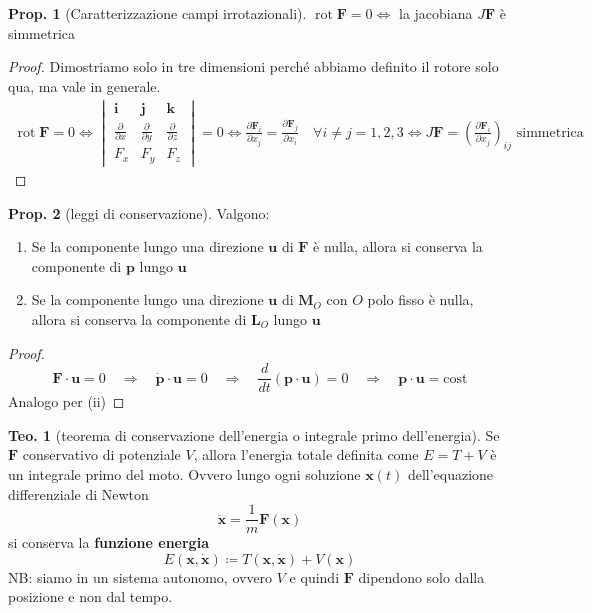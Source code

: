 \documentclass[a4paper,10pt]{article}
\theoremstyle{definition}
\DeclareMathOperator*{\rot}{rot}
\newcommand{\bv}{\boldsymbol} %
\theoremstyle{indentdefinition}
\theoremstyle{indenttheorem}
\newtheorem{thm}{Teo.}
\newtheorem{prop}{Prop.}
\theoremstyle{myremark}
\theoremstyle{indentgeneral}
\begin{document}
\begin{prop}[Caratterizzazione campi irrotazionali]\label{caratterizzazione-campi-irrotazionali}
$\rot \bv{F}=0\iff$ la jacobiana $J\bv{F}$ è simmetrica
\end{prop}
\begin{proof} Dimostriamo solo in tre dimensioni perché abbiamo definito il rotore solo qua, ma vale in generale. 
   \begin{align*}
    \rot \bv{F}=0\iff\begin{vmatrix}\boldsymbol{i} & \boldsymbol{j} & \boldsymbol{k}\\
\frac{\partial}{\partial x} & \frac{\partial}{\partial y} & \frac{\partial}{\partial z}\\
F_{x} & F_{y} & F_{z}
\end{vmatrix}=0 \iff \frac{\partial\bv{F}_i}{\partial x_j}=\frac{\partial\bv{F}_j}{\partial x_i} \quad\forall i\ne j=1,2,3\iff J\bv{F}=\left(\frac{\partial\bv{F}_i}{\partial x_j}\right)_{ij} \text{ simmetrica}
  \end{align*}
\end{proof}

\begin{prop}[leggi di conservazione]
\label{prop:leggi-conservazione}Valgono:
\end{prop}

\begin{enumerate}
\item Se la componente lungo una direzione $\boldsymbol{u}$ di $\boldsymbol{F}$
è nulla, allora si conserva la componente di $\boldsymbol{p}$ lungo
$\boldsymbol{u}$
\item Se la componente lungo una direzione $\boldsymbol{u}$ di $\boldsymbol{M}_{O}$
con $O$ polo fisso è nulla, allora si conserva la componente di $\boldsymbol{L}_{O}$
lungo $\boldsymbol{u}$
\end{enumerate}
\begin{proof}
\[
\boldsymbol{F}\cdot\boldsymbol{u}=0\quad\Longrightarrow\quad\dot{\boldsymbol{p}}\cdot\boldsymbol{u}=0\quad\Longrightarrow\quad\frac{d}{dt}\left(\boldsymbol{p}\cdot\boldsymbol{u}\right)=0\quad\Longrightarrow\quad\boldsymbol{p}\cdot\boldsymbol{u}=\text{cost}
\]
Analogo per (ii)
\end{proof}
\begin{thm}[teorema di conservazione dell'energia o integrale primo dell'energia]
\label{thm:conservazione-energia}Se $\boldsymbol{F}$ conservativo
di potenziale $V$, allora l'energia totale definita come $E=T+V$
è un integrale primo del moto. Ovvero lungo ogni soluzione ${\bv{x}}(t)$ dell'equazione differenziale di Newton
$$\ddot{\bv{x}}=\frac{1}{m}\bv{F}(\bv{x})$$
si conserva la \textbf{funzione energia} 
$$E(\bv{x},\dot{\bv{x}})\coloneqq T(\bv{x},\dot{\bv{x}})+V(\bv{x})$$
NB: siamo in un sistema autonomo, ovvero $V$ e quindi $\bv{F}$ dipendono solo dalla posizione e non dal tempo.
\end{thm}
\end{document}
